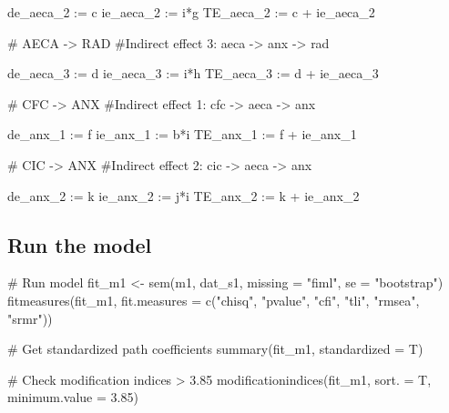 \documentclass[
  letterpaper,
  DIV=11,
  numbers=noendperiod]{scrreprt}
\newenvironment{Shaded}{\begin{snugshade}}{\end{snugshade}}
\newcommand{\AttributeTok}[1]{\textcolor[rgb]{0.40,0.45,0.13}{#1}}
\newcommand{\CommentTok}[1]{\textcolor[rgb]{0.37,0.37,0.37}{#1}}
\newcommand{\FloatTok}[1]{\textcolor[rgb]{0.68,0.00,0.00}{#1}}
\newcommand{\FunctionTok}[1]{\textcolor[rgb]{0.28,0.35,0.67}{#1}}
\newcommand{\NormalTok}[1]{\textcolor[rgb]{0.00,0.23,0.31}{#1}}
\newcommand{\OtherTok}[1]{\textcolor[rgb]{0.00,0.23,0.31}{#1}}
\newcommand{\StringTok}[1]{\textcolor[rgb]{0.13,0.47,0.30}{#1}}
\begin{document}
\begin{Shaded}
\begin{Highlighting}[]
\StringTok{de\_aeca\_2 := c}
\StringTok{ie\_aeca\_2 := i*g}
\StringTok{TE\_aeca\_2 := c + ie\_aeca\_2}

\StringTok{\# AECA {-}\textgreater{} RAD}
\StringTok{\#Indirect effect 3: aeca {-}\textgreater{} anx {-}\textgreater{} rad}

\StringTok{de\_aeca\_3 := d}
\StringTok{ie\_aeca\_3 := i*h}
\StringTok{TE\_aeca\_3 := d + ie\_aeca\_3}


\StringTok{\# CFC {-}\textgreater{} ANX}
\StringTok{\#Indirect effect 1: cfc {-}\textgreater{} aeca {-}\textgreater{} anx}

\StringTok{de\_anx\_1 := f}
\StringTok{ie\_anx\_1 := b*i}
\StringTok{TE\_anx\_1 := f + ie\_anx\_1}

\StringTok{\# CIC {-}\textgreater{} ANX}
\StringTok{\#Indirect effect 2: cic {-}\textgreater{} aeca {-}\textgreater{} anx}

\StringTok{de\_anx\_2 := k}
\StringTok{ie\_anx\_2 := j*i}
\StringTok{TE\_anx\_2 := k + ie\_anx\_2}
\StringTok{\textquotesingle{}}
\end{Highlighting}
\end{Shaded}

\subsection{Run the model}\label{run-the-model}

\begin{Shaded}
\begin{Highlighting}[]
\CommentTok{\# Run model}
\NormalTok{fit\_m1 }\OtherTok{\textless{}{-}} \FunctionTok{sem}\NormalTok{(m1, dat\_s1, }\AttributeTok{missing =} \StringTok{"fiml"}\NormalTok{, }\AttributeTok{se =} \StringTok{"bootstrap"}\NormalTok{)}
\FunctionTok{fitmeasures}\NormalTok{(fit\_m1, }\AttributeTok{fit.measures =} \FunctionTok{c}\NormalTok{(}\StringTok{"chisq"}\NormalTok{, }\StringTok{"pvalue"}\NormalTok{, }\StringTok{"cfi"}\NormalTok{, }\StringTok{"tli"}\NormalTok{, }\StringTok{"rmsea"}\NormalTok{, }\StringTok{"srmr"}\NormalTok{))}

\CommentTok{\# Get standardized path coefficients}
\FunctionTok{summary}\NormalTok{(fit\_m1, }\AttributeTok{standardized =}\NormalTok{ T) }

\CommentTok{\# Check modification indices \textgreater{} 3.85}
\FunctionTok{modificationindices}\NormalTok{(fit\_m1, }\AttributeTok{sort. =}\NormalTok{ T, }\AttributeTok{minimum.value =} \FloatTok{3.85}\NormalTok{) }
\end{Highlighting}
\end{Shaded}
\end{document}
